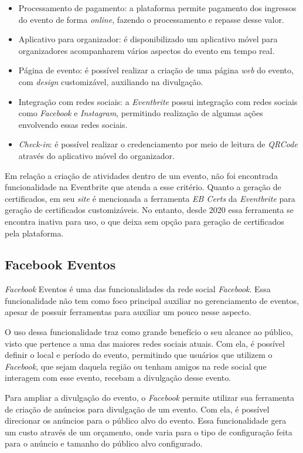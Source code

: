 \begin{itemize}
    \item Processamento de pagamento: a plataforma permite pagamento dos ingressos do evento de forma \textit{online}, fazendo o processamento e repasse desse valor.
    \item Aplicativo para organizador: é disponibilizado um aplicativo móvel para organizadores acompanharem vários aspectos do evento em tempo real.
    \item Página de evento: é possível realizar a criação de uma página \textit{web} do evento, com \textit{design} customizável, auxiliando na divulgação.
    \item Integração com redes sociais: a \textit{Eventbrite} possui integração com redes sociais como \textit{Facebook} e \textit{Instagram}, permitindo realização de algumas ações envolvendo essas redes sociais.
    \item \textit{Check-in}: é possível realizar o credenciamento por meio de leitura de \textit{QRCode} através do aplicativo móvel do organizador.
\end{itemize}

Em relação a criação de atividades dentro de um evento, não foi encontrada funcionalidade na Eventbrite que atenda a esse critério. Quanto a geração de certificados, em seu \textit{site} é mencionada a ferramenta \textit{EB Certs} da \textit{Eventbrite} para geração de certificados customizáveis. No entanto, desde 2020 essa ferramenta se encontra inativa para uso, o que deixa sem opção para geração de certificados pela plataforma.

\subsection{Facebook Eventos}

\textit{Facebook} Eventos é uma das funcionalidades da rede social \textit{Facebook}. Essa funcionalidade não tem como foco principal auxiliar no gerenciamento de eventos, apesar de possuir ferramentas para auxiliar um pouco nesse aspecto.

O uso dessa funcionalidade traz como grande benefício o seu alcance ao público, visto que pertence a uma das maiores redes sociais atuais. Com ela, é possível definir o local e período do evento, permitindo que usuários que utilizem o \textit{Facebook}, que sejam daquela região ou tenham amigos na rede social que interagem com esse evento, recebam a divulgação desse evento.

Para ampliar a divulgação do evento, o \textit{Facebook} permite utilizar sua ferramenta de criação de anúncios para divulgação de um evento. Com ela, é possível direcionar os anúncios para o público alvo do evento. Essa funcionalidade gera um custo através de um orçamento, onde varia para o tipo de configuração feita para o anúncio e tamanho do público alvo configurado.

